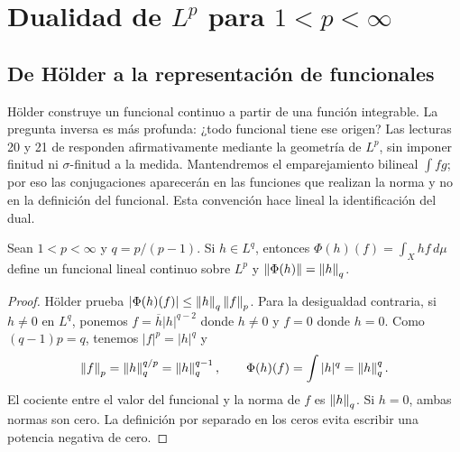 \chapter{Dualidad de \texorpdfstring{$L^p$ para $1<p<\infty$}{Lp para 1<p<infinito}}\label{v2:cap10}\label{cap:v2-10}
\section{De Hölder a la representación de funcionales}\label{lectura:v2-20}
Hölder construye un funcional continuo a partir de una función integrable. La pregunta inversa es más profunda: ¿todo funcional tiene ese origen? Las lecturas 20 y 21 de \cite{valencia2} responden afirmativamente mediante la geometría de $L^p$, sin imponer finitud ni $\sigma$-finitud a la medida. Mantendremos el emparejamiento bilineal $\int fg$; por eso las conjugaciones aparecerán en las funciones que realizan la norma y no en la definición del funcional. Esta convención hace lineal la identificación del dual.

\begin{proposicion}\label{v2:dual-isometria}
Sean $1<p<\infty$ y $q=p/(p-1)$. Si $h\in L^q$, entonces $\Phi(h)(f)=\int_Xhf\,d\mu$ define un funcional lineal continuo sobre $L^p$ y $\left\lVert\Phi(h)\right\rVert=\left\lVert h\right\rVert_q$.
\end{proposicion}
\begin{proof}
Hölder prueba $|\Phi(h)(f)|\le\left\lVert h\right\rVert_q\left\lVert f\right\rVert_p$. Para la desigualdad contraria, si $h\ne0$ en $L^q$, ponemos $f=\overline h|h|^{q-2}$ donde $h\ne0$ y $f=0$ donde $h=0$. Como $(q-1)p=q$, tenemos $|f|^p=|h|^q$ y
\[
 \left\lVert f\right\rVert_p=\left\lVert h\right\rVert_q^{q/p}=\left\lVert h\right\rVert_q^{q-1},\qquad
 \Phi(h)(f)=\int|h|^q=\left\lVert h\right\rVert_q^q.
\]
El cociente entre el valor del funcional y la norma de $f$ es $\left\lVert h\right\rVert_q$. Si $h=0$, ambas normas son cero. La definición por separado en los ceros evita escribir una potencia negativa de cero.
\end{proof}

